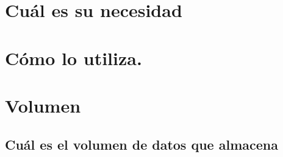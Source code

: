 %
%

\section{Cuál es su necesidad}

\lipsum[2] %

\clearpage
\section{Cómo lo utiliza.}

\lipsum[2] %


\clearpage
\section{Volumen}

\lipsum[1] %

\subsection{Cuál es el volumen de datos que almacena}
\lipsum[1] %

